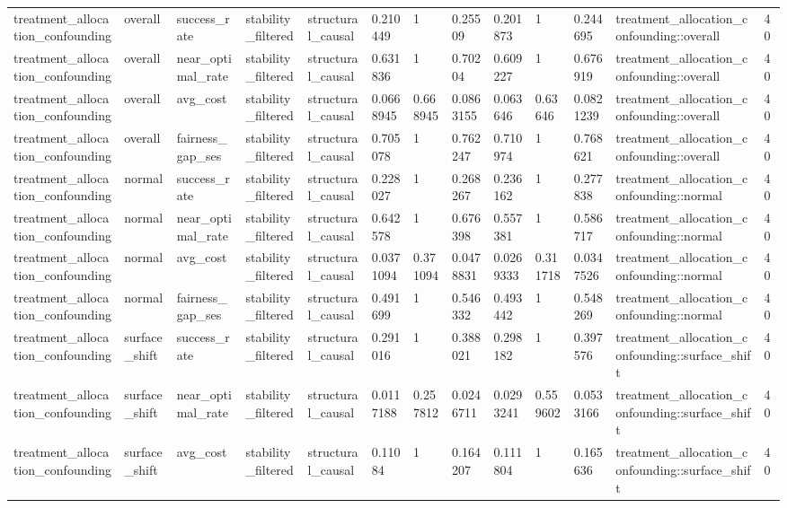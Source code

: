 \begin{tabular}{lllllllllllll}
treatment\_allocation\_confounding & overall & success\_rate & stability\_filtered & structural\_causal & 0.210449 & 1 & 0.25509 & 0.201873 & 1 & 0.244695 & treatment\_allocation\_confounding::overall & 40 \\
treatment\_allocation\_confounding & overall & near\_optimal\_rate & stability\_filtered & structural\_causal & 0.631836 & 1 & 0.70204 & 0.609227 & 1 & 0.676919 & treatment\_allocation\_confounding::overall & 40 \\
treatment\_allocation\_confounding & overall & avg\_cost & stability\_filtered & structural\_causal & 0.0668945 & 0.668945 & 0.0863155 & 0.063646 & 0.63646 & 0.0821239 & treatment\_allocation\_confounding::overall & 40 \\
treatment\_allocation\_confounding & overall & fairness\_gap\_ses & stability\_filtered & structural\_causal & 0.705078 & 1 & 0.762247 & 0.710974 & 1 & 0.768621 & treatment\_allocation\_confounding::overall & 40 \\
treatment\_allocation\_confounding & normal & success\_rate & stability\_filtered & structural\_causal & 0.228027 & 1 & 0.268267 & 0.236162 & 1 & 0.277838 & treatment\_allocation\_confounding::normal & 40 \\
treatment\_allocation\_confounding & normal & near\_optimal\_rate & stability\_filtered & structural\_causal & 0.642578 & 1 & 0.676398 & 0.557381 & 1 & 0.586717 & treatment\_allocation\_confounding::normal & 40 \\
treatment\_allocation\_confounding & normal & avg\_cost & stability\_filtered & structural\_causal & 0.0371094 & 0.371094 & 0.0478831 & 0.0269333 & 0.311718 & 0.0347526 & treatment\_allocation\_confounding::normal & 40 \\
treatment\_allocation\_confounding & normal & fairness\_gap\_ses & stability\_filtered & structural\_causal & 0.491699 & 1 & 0.546332 & 0.493442 & 1 & 0.548269 & treatment\_allocation\_confounding::normal & 40 \\
treatment\_allocation\_confounding & surface\_shift & success\_rate & stability\_filtered & structural\_causal & 0.291016 & 1 & 0.388021 & 0.298182 & 1 & 0.397576 & treatment\_allocation\_confounding::surface\_shift & 40 \\
treatment\_allocation\_confounding & surface\_shift & near\_optimal\_rate & stability\_filtered & structural\_causal & 0.0117188 & 0.257812 & 0.0246711 & 0.0293241 & 0.559602 & 0.0533166 & treatment\_allocation\_confounding::surface\_shift & 40 \\
treatment\_allocation\_confounding & surface\_shift & avg\_cost & stability\_filtered & structural\_causal & 0.11084 & 1 & 0.164207 & 0.111804 & 1 & 0.165636 & treatment\_allocation\_confounding::surface\_shift & 40 \\

\end{tabular}
